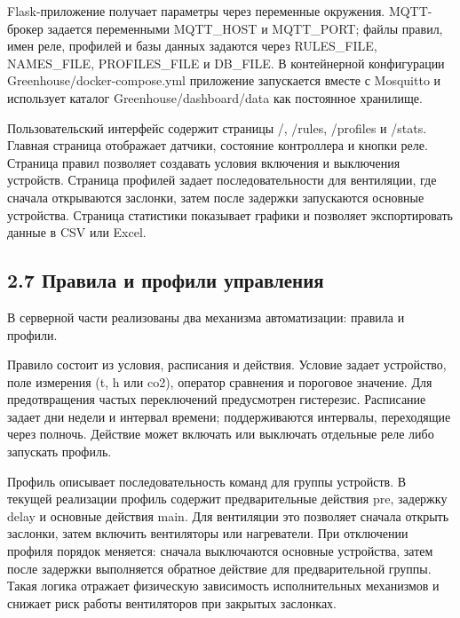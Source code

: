 \documentclass[a4paper,14pt]{extarticle}
\renewcommand{\texttt}[1]{\textnormal{#1}}
\begin{document}
Flask-приложение получает параметры через переменные окружения.
MQTT-брокер задается переменными \texttt{MQTT\_HOST} и
\texttt{MQTT\_PORT}; файлы правил, имен реле, профилей и базы данных
задаются через \texttt{RULES\_FILE}, \texttt{NAMES\_FILE},
\texttt{PROFILES\_FILE} и \texttt{DB\_FILE}. В контейнерной конфигурации
\texttt{Greenhouse/docker-compose.yml} приложение запускается вместе с
Mosquitto и использует каталог \texttt{Greenhouse/dashboard/data} как
постоянное хранилище.

Пользовательский интерфейс содержит страницы \texttt{/},
\texttt{/rules}, \texttt{/profiles} и \texttt{/stats}. Главная страница
отображает датчики, состояние контроллера и кнопки реле. Страница правил
позволяет создавать условия включения и выключения устройств. Страница
профилей задает последовательности для вентиляции, где сначала
открываются заслонки, затем после задержки запускаются основные
устройства. Страница статистики показывает графики и позволяет
экспортировать данные в CSV или Excel.

\subsection{2.7 Правила и профили
управления}\label{ux43fux440ux430ux432ux438ux43bux430-ux438-ux43fux440ux43eux444ux438ux43bux438-ux443ux43fux440ux430ux432ux43bux435ux43dux438ux44f}

В серверной части реализованы два механизма автоматизации: правила и
профили.

Правило состоит из условия, расписания и действия. Условие задает
устройство, поле измерения (\texttt{t}, \texttt{h} или \texttt{co2}),
оператор сравнения и пороговое значение. Для предотвращения частых
переключений предусмотрен гистерезис. Расписание задает дни недели и
интервал времени; поддерживаются интервалы, переходящие через полночь.
Действие может включать или выключать отдельные реле либо запускать
профиль.

Профиль описывает последовательность команд для группы устройств. В
текущей реализации профиль содержит предварительные действия
\texttt{pre}, задержку \texttt{delay} и основные действия \texttt{main}.
Для вентиляции это позволяет сначала открыть заслонки, затем включить
вентиляторы или нагреватели. При отключении профиля порядок меняется:
сначала выключаются основные устройства, затем после задержки
выполняется обратное действие для предварительной группы. Такая логика
отражает физическую зависимость исполнительных механизмов и снижает риск
работы вентиляторов при закрытых заслонках.
\end{document}
